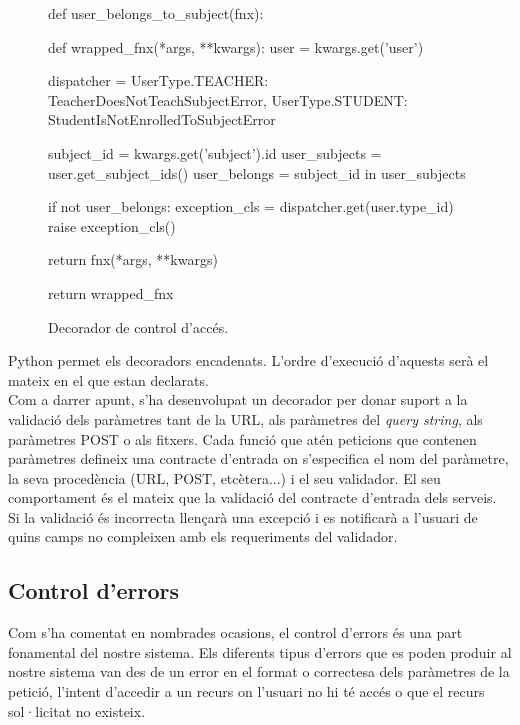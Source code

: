 \begin{figure}[h!]
	\begin{python}
def user_belongs_to_subject(fnx):
	
	def wrapped_fnx(*args, **kwargs):
		user = kwargs.get('user')
		
		dispatcher = {
			UserType.TEACHER: TeacherDoesNotTeachSubjectError,
			UserType.STUDENT: StudentIsNotEnrolledToSubjectError
		}
		
		subject_id = kwargs.get('subject').id
		user_subjects = user.get_subject_ids()
		user_belongs = subject_id in user_subjects
		
		if not user_belongs:
			exception_cls = dispatcher.get(user.type_id)
			raise exception_cls()
		
		return fnx(*args, **kwargs)

	return wrapped_fnx
	\end{python}
	\label{fig:decorador_control_acces}
	\caption{Decorador de control d'accés.}
\end{figure}

Python permet els decoradors encadenats. L'ordre d'execució d'aquests serà el mateix en el que estan declarats. \\

Com a darrer apunt, s'ha desenvolupat un decorador per donar suport a la validació dels paràmetres tant de la \ac{URL}, als paràmetres del \emph{query string}, als paràmetres POST o als fitxers. Cada funció que atén peticions que contenen paràmetres defineix una contracte d'entrada on s'especifica el nom del paràmetre, la seva procedència (\ac{URL}, POST, etcètera...) i el seu validador. El seu comportament és el mateix que la validació del contracte d'entrada dels serveis. Si la validació és incorrecta llençarà una excepció i es notificarà a l'usuari de quins camps no compleixen amb els requeriments del validador.

\subsection{Control d'errors} \label{control_errors}

Com s'ha comentat en nombrades ocasions, el control d'errors és una part fonamental del nostre sistema. Els diferents tipus d'errors que es poden produir al nostre sistema van des de un error en el format o correctesa dels paràmetres de la petició, l'intent d'accedir a un recurs on l'usuari no hi té accés o que el recurs sol·licitat no existeix.\\

